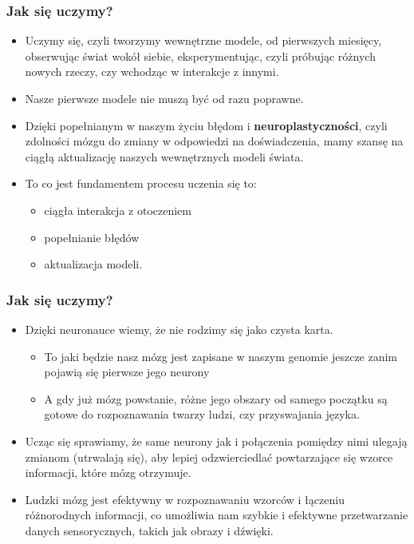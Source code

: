 \documentclass{beamer}
\begin{document}
\begin{frame}[fragile]
\frametitle{Jak się uczymy?}
\begin{itemize}
\item Uczymy się, czyli tworzymy wewnętrzne modele, od pierwszych miesięcy, obserwując świat wokół siebie, eksperymentując, czyli próbując różnych nowych rzeczy, czy wchodząc w interakcje z innymi.
\item Nasze pierwsze modele nie muszą być od razu poprawne. 
\item Dzięki popełnianym w naszym życiu błędom i \textbf{neuroplastyczności}, czyli zdolności mózgu do zmiany w odpowiedzi na doświadczenia, mamy szansę na ciągłą aktualizację naszych wewnętrznych modeli świata. 
\item To co jest fundamentem procesu uczenia się to: 
	\begin{itemize}
	\item ciągła interakcja z otoczeniem
	\item popełnianie błędów
	\item aktualizacja modeli.
	\end{itemize}
\end{itemize}
\end{frame}

\begin{frame}[fragile]
\frametitle{Jak się uczymy?}
\begin{itemize}
\item Dzięki neuronauce wiemy, że nie rodzimy się jako czysta karta.
	\begin{itemize}
	\item To jaki będzie nasz mózg jest zapisane w naszym genomie jeszcze zanim pojawią się pierwsze jego neurony
	\item A gdy już mózg powstanie, różne jego obszary od samego początku są gotowe do rozpoznawania twarzy ludzi, czy przyswajania języka.
	\end{itemize}
\item Ucząc się sprawiamy, że same neurony jak i połączenia pomiędzy nimi ulegają zmianom (utrwalają się), aby lepiej odzwierciedlać powtarzające się wzorce informacji, które mózg otrzymuje. 
\item Ludzki mózg jest efektywny w rozpoznawaniu wzorców i łączeniu różnorodnych informacji, co umożliwia nam szybkie i efektywne przetwarzanie danych sensorycznych, takich jak obrazy i dźwięki. 
\end{itemize}
\end{frame}
\end{document}
